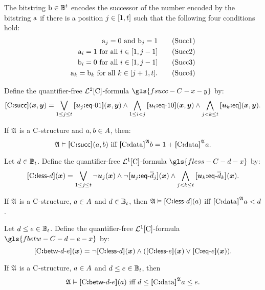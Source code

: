 The bitstring $\mathrm{b} \in \mathbb{B}^{t}$ encodes the successor of the number
encoded by the bitstring $\mathrm{a}$ if there is a position $j \in [1,t]$
such that the following four conditions hold:
\begin{align}
  \bstra_\jj = 0 \text{ and } \bstrb_\jj = 1 \tag{Succ1}\label{Succ1} \\
  \bstra_\ii = 1 \text{ for all } i \in [1,\jj-1] \tag{Succ2}\label{Succ2} \\
  \bstrb_\ii = 0 \text{ for all } i \in [1,\jj-1] \tag{Succ3}\label{Succ3} \\
  \bstra_\kk = \bstrb_\kk \text{ for all } \kk \in [\jj+1,\tbit].
  \tag{Succ4}\label{Succ4}
\end{align}
\begin{definition}
Define the quantifier-free $\mathcal{L}^{2}[{\mathrm{C}}]$-formula $\gls{fsucc-C-x-y}$ by:
\[
  {\bm{[}{\mathrm{C}}\mathord{\bm{:}}\mathsf{succ}\bm{]}}(\bm{x},\bm{y}) = \bigvee_{1 \leq j \leq t}
  {\bm{[}\bm{u}_{j}\mathord{\bm{:}}\mathsf{eq}{\hbox{-}}01\bm{]}}(\bm{x},\bm{y}) \land 
  \bigwedge_{1 \leq i < j} 
  {\bm{[}\bm{u}_{i}\mathord{\bm{:}}\mathsf{eq}{\hbox{-}}10\bm{]}}(\bm{x},\bm{y}) \land
  \bigwedge_{j < k \leq t} {\bm{[}\bm{u}_{k}\mathord{\bm{:}}\mathsf{eq}\bm{]}}(\bm{x},\bm{y}).
\]
\end{definition}
\begin{remark}
If $\mathfrak{A}$ is a ${\mathrm{C}}$-structure and $a, b \in A$,
then:
\[
  \miff{
  \StrA \vDash \fsucc\CS(\ea, \eb)}{
  \data\CS\StrA\eb = 1 + \data\CS\StrA\ea}.
\]
\end{remark}
\begin{definition}
Let $d \in \mathbb{B}_{t}$.
Define the quantifier-free $\mathcal{L}^{1}[{\mathrm{C}}]$-formula $\gls{fless-C-d-x}$ by:
\[
  {\bm{[}{\mathrm{C}}\mathord{\bm{:}}\mathsf{less}{\hbox{-}}d\bm{]}}(\bm{x}) = \bigvee_{1 \leq j \leq t} \lnot\bm{u}_{j}(\bm{x})
  \land \lnot{\bm{[}\bm{u}_{j}\mathord{\bm{:}}\mathsf{eq}{\hbox{-}}\overline{d}_j\bm{]}}(\bm{x})
    \land \bigwedge_{j < k \leq t} {\bm{[}\bm{u}_{k}\mathord{\bm{:}}\mathsf{eq}{\hbox{-}}\overline{d}_k\bm{]}}(\bm{x}).
\]
\end{definition}
\begin{remark}
If $\mathfrak{A}$ is a ${\mathrm{C}}$-structure, $a \in A$ and $d \in
\mathbb{B}_{t}$, then $\mathfrak{A} \vDash {\bm{[}{\mathrm{C}}\mathord{\bm{:}}\mathsf{less}{\hbox{-}}d\bm{]}}(a)$ iff ${\bm{[}{\mathrm{C}}\mathord{\bm{:}}\mathrm{data}\bm{]}}^{\mathfrak{A}}a
< d$.
\end{remark}
\begin{definition}
Let $d \leq e \in \mathbb{B}_{t}$.
Define the quantifier-free $\mathcal{L}^{1}[{\mathrm{C}}]$-formula $\gls{fbetw-C-d-e-x}$ by:
\[
  {\bm{[}{\mathrm{C}}\mathord{\bm{:}}\mathsf{betw}{\hbox{-}}d{\hbox{-}}e\bm{]}}(\bm{x}) = \lnot{\bm{[}{\mathrm{C}}\mathord{\bm{:}}\mathsf{less}{\hbox{-}}d\bm{]}}(\bm{x}) \land 
  ({\bm{[}{\mathrm{C}}\mathord{\bm{:}}\mathsf{less}{\hbox{-}}e\bm{]}}(\bm{x})\lor {\bm{[}{\mathrm{C}}\mathord{\bm{:}}\mathsf{eq}{\hbox{-}}e\bm{]}}(\bm{x})).
\]
\end{definition}
\begin{remark}
If $\mathfrak{A}$ is a ${\mathrm{C}}$-structure, $a \in A$ and $d \leq e \in
\mathbb{B}_{t}$, then 
\[
  \miff{
  \StrA \vDash \fbetw\CS\datad\datae(\ea)}{
  \datad \leq \data\CS\StrA\ea \leq
  \datae}.
\]
\end{remark}

